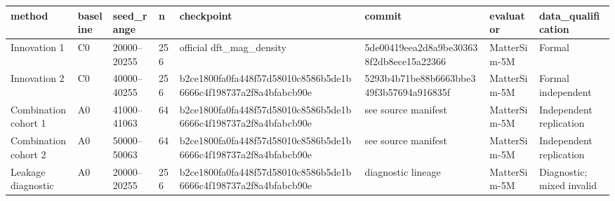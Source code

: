 \begin{tabular}{llllllll}
\toprule
method & baseline & seed\_range & n & checkpoint & commit & evaluator & data\_qualification \\
\midrule
Innovation 1 & C0 & 20000–20255 & 256 & official dft\_mag\_density & 5de00419eea2d8a9be303638f2db8ece15a22366 & MatterSim-5M & Formal \\
Innovation 2 & C0 & 40000–40255 & 256 & b2ce1800fa0fa448f57d58010c8586b5de1b6666c4f198737a2f8a4bfabcb90e & 5293b4b71be88b6663bbe349f3b57694a916835f & MatterSim-5M & Formal independent \\
Combination cohort 1 & A0 & 41000–41063 & 64 & b2ce1800fa0fa448f57d58010c8586b5de1b6666c4f198737a2f8a4bfabcb90e & see source manifest & MatterSim-5M & Independent replication \\
Combination cohort 2 & A0 & 50000–50063 & 64 & b2ce1800fa0fa448f57d58010c8586b5de1b6666c4f198737a2f8a4bfabcb90e & see source manifest & MatterSim-5M & Independent replication \\
Leakage diagnostic & A0 & 20000–20255 & 256 & b2ce1800fa0fa448f57d58010c8586b5de1b6666c4f198737a2f8a4bfabcb90e & diagnostic lineage & MatterSim-5M & Diagnostic; mixed invalid \\
\bottomrule
\end{tabular}
